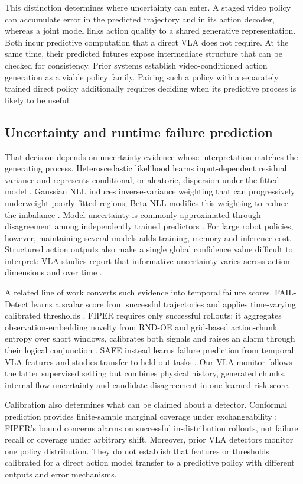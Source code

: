This distinction determines where uncertainty can enter. A staged video policy
can accumulate error in the predicted trajectory and in its action decoder,
whereas a joint model links action quality to a shared generative
representation. Both incur predictive computation that a direct VLA does not
require. At the same time, their predicted futures expose intermediate
structure that can be checked for consistency. Prior systems establish
video-conditioned action generation as a viable policy family. Pairing such a
policy with a separately trained direct policy additionally requires deciding
when its predictive process is likely to be useful.

\subsection{Uncertainty and runtime failure prediction}

That decision depends on uncertainty evidence whose interpretation matches the
generating process. Heteroscedastic likelihood learns input-dependent residual
variance and represents conditional, or aleatoric, dispersion under the fitted
model \cite{kendallgal}. Gaussian NLL induces inverse-variance weighting that
can progressively underweight poorly fitted regions; Beta-NLL modifies this
weighting to reduce the imbalance \cite{betanll}. Model uncertainty is commonly
approximated through disagreement among independently trained predictors
\cite{deepensembles}. For large robot policies, however, maintaining several
models adds training, memory and inference cost. Structured action outputs also
make a single global confidence value difficult to interpret: VLA studies
report that informative uncertainty varies across action dimensions and over
time \cite{criticaluq,vlacalibration}.

A related line of work converts such evidence into temporal failure scores.
FAIL-Detect learns a scalar score from successful trajectories and applies
time-varying calibrated thresholds \cite{faildetect}. FIPER requires only
successful rollouts: it aggregates observation-embedding novelty from RND-OE
and grid-based action-chunk entropy over short windows, calibrates both signals
and raises an alarm through their logical conjunction \cite{fiper}. SAFE instead
learns failure prediction from temporal VLA features and studies transfer to
held-out tasks \cite{safevla}. Our VLA monitor follows the latter supervised
setting but combines physical history, generated chunks, internal flow
uncertainty and candidate disagreement in one learned risk score.

Calibration also determines what can be claimed about a detector. Conformal
prediction provides finite-sample marginal coverage under exchangeability
\cite{conformal}; FIPER's bound concerns alarms on successful in-distribution
rollouts, not failure recall or coverage under arbitrary shift. Moreover, prior
VLA detectors monitor one policy distribution. They do not establish that
features or thresholds calibrated for a direct action model transfer to a
predictive policy with different outputs and error mechanisms.
